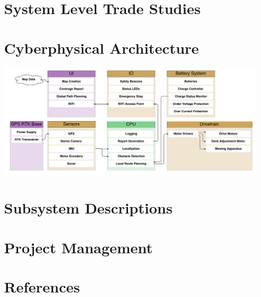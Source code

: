 \documentclass{article}
\begin{document}
\section{System Level Trade Studies}

\section{Cyberphysical Architecture}
\includegraphics[scale=0.2]{cyberphysical}

\section{Subsystem Descriptions}

\section{Project Management}

\section{References}
\end{document}
